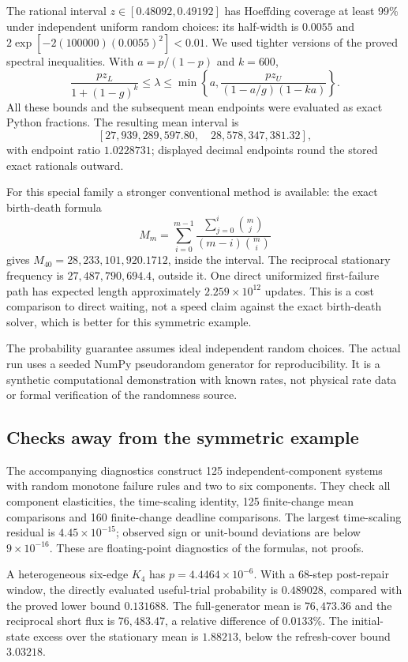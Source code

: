 \documentclass[11pt,a4paper]{article}
\begin{document}
The rational interval $z\in[0.48092,0.49192]$ has Hoeffding coverage at least 99\% under independent uniform random choices: its half-width is $0.0055$ and $2\exp[-2(100000)(0.0055)^2]<0.01$. We used tighter versions of the proved spectral inequalities. With $a=p/(1-p)$ and $k=600$,
\[
 \frac{pz_L}{1+(1-g)^k}\le\lambda\le
 \min\left\{a,\frac{pz_U}{(1-a/g)(1-ka)}\right\}.
\]
All these bounds and the subsequent mean endpoints were evaluated as exact Python fractions. The resulting mean interval is
\begin{equation}
 \boxed{[27{,}939{,}289{,}597.80,\quad28{,}578{,}347{,}381.32],}
\end{equation}
with endpoint ratio $1.0228731$; displayed decimal endpoints round the stored exact rationals outward.

For this special family a stronger conventional method is available: the exact birth-death formula
\[
 M_m=\sum_{i=0}^{m-1}\frac{\sum_{j=0}^i\binom mj}{(m-i)\binom mi}
\]
gives $M_{40}=28{,}233{,}101{,}920.1712$, inside the interval. The reciprocal stationary frequency is $27{,}487{,}790{,}694.4$, outside it. One direct uniformized first-failure path has expected length approximately $2.259\times10^{12}$ updates. This is a cost comparison to direct waiting, not a speed claim against the exact birth-death solver, which is better for this symmetric example.

The probability guarantee assumes ideal independent random choices. The actual run uses a seeded NumPy pseudorandom generator for reproducibility. It is a synthetic computational demonstration with known rates, not physical rate data or formal verification of the randomness source.

\subsection{Checks away from the symmetric example}
The accompanying diagnostics construct 125 independent-component systems with random monotone failure rules and two to six components. They check all component elasticities, the time-scaling identity, 125 finite-change mean comparisons and 160 finite-change deadline comparisons. The largest time-scaling residual is $4.45\times10^{-15}$; observed sign or unit-bound deviations are below $9\times10^{-16}$. These are floating-point diagnostics of the formulas, not proofs.

A heterogeneous six-edge $K_4$ has $p=4.4464\times10^{-6}$. With a 68-step post-repair window, the directly evaluated useful-trial probability is $0.489028$, compared with the proved lower bound $0.131688$. The full-generator mean is $76{,}473.36$ and the reciprocal short flux is $76{,}483.47$, a relative difference of $0.0133\%$. The initial-state excess over the stationary mean is $1.88213$, below the refresh-cover bound $3.03218$.
\end{document}
